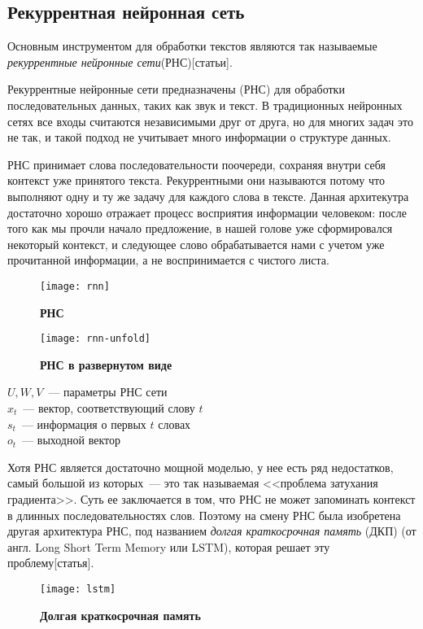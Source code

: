\subsection{Рекуррентная нейронная сеть}
Основным инструментом для обработки текстов являются так называемые \emph{рекуррентные нейронные сети}(РНС)[статьи].

Рекуррентные нейронные сети предназначены (РНС) для обработки последовательных данных, таких как звук и текст. В традиционных нейронных сетях все входы считаются независимыми друг от друга, но для многих задач это не так, и такой подход не учитывает много информации о структуре данных.

РНС принимает слова последовательности поочереди, сохраняя внутри себя контекст уже принятого текста. Рекуррентными они называются потому что выполняют одну и ту же задачу для каждого слова в тексте. Данная архитекутра достаточно хорошо отражает процесс восприятия информации человеком: после того как мы прочли начало предложение, в нашей голове уже сформировался некоторый контекст, и следующее слово обрабатывается нами с учетом уже прочитанной информации, а не воспринимается с чистого листа.

\begin{figure}[h]
\texttt{[image: rnn]}
\caption{\textbf{РНС}}
\label{fig:rnn}
\end{figure}

\begin{figure}[h]
\texttt{[image: rnn-unfold]}
\caption{\textbf{РНС в развернутом виде}}
\label{fig:rnn-unfold}
\end{figure}

\noindent $U, W, V$~--- параметры РНС сети\\
$x_t$~--- вектор, соответствующий слову $t$ \\
$s_t$~--- информация о первых $t$ словах \\
$o_t$~--- выходной вектор

Хотя РНС является достаточно мощной моделью, у нее есть ряд недостатков, самый большой из которых~--- это так называемая <<проблема затухания градиента>>. Суть ее заключается в том, что РНС не может запоминать контекст в длинных последовательностях слов. Поэтому на смену РНС была изобретена другая архитектура РНС, под названием \emph{долгая краткосрочная память} (ДКП) (от англ. Long Short Term Memory или LSTM), которая решает эту проблему[статья].

\begin{figure}[h]
\texttt{[image: lstm]}
\caption{\textbf{Долгая краткосрочная память}}
\label{fig:lstm}
\end{figure}

